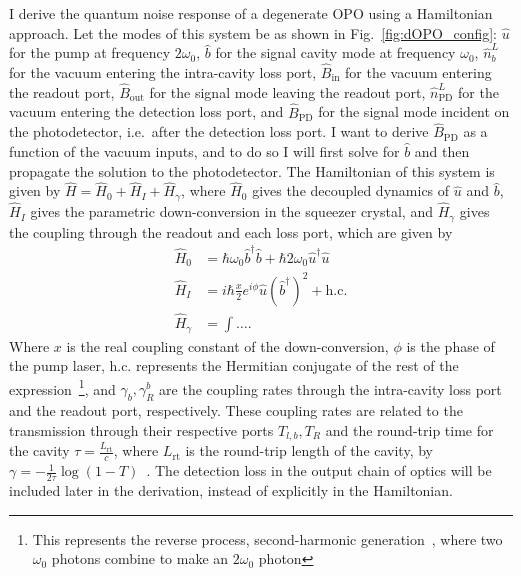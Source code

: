 I derive the quantum noise response of a degenerate OPO using a Hamiltonian approach. Let the modes of this system be as shown in Fig.~\ref{fig:dOPO_config}: $\hat u$ for the pump at frequency $2\omega_0$, $\hat b$ for the signal cavity mode at frequency $\omega_0$, $\hat n^L_b$ for the vacuum entering the intra-cavity loss port, $\hat B_\text{in}$ for the vacuum entering the readout port, $\hat B_\text{out}$ for the signal mode leaving the readout port, $\hat n^L_\text{PD}$ for the vacuum entering the detection loss port, and $\hat B_\text{PD}$ for the signal mode incident on the photodetector, i.e.\ after the detection loss port. I want to derive $\hat B_\text{PD}$ as a function of the vacuum inputs, and to do so I will first solve for $\hat b$ and then propagate the solution to the photodetector. 
The Hamiltonian of this system is given by $\hat H = \hat H_0 + \hat H_I + \hat H_\gamma$, where $\hat H_0$ gives the decoupled dynamics of $\hat u$ and $\hat b$, $\hat H_I$ gives the parametric down-conversion in the squeezer crystal, and $\hat H_\gamma$ gives the coupling through the readout and each loss port, which are given by~\cite{} 
\begin{align}
\hat H_0 &= \hbar \omega_0 \hat b^\dag \hat b + \hbar 2 \omega_0 \hat u^\dag \hat u\\
\hat H_I &= i \hbar \frac{x}{2} e^{i\phi} \hat u (\hat b^\dag)^2 + \text{h.c.}\\
\hat H_\gamma &= \int \ldots .
\end{align}
Where $x$ is the real coupling constant of the down-conversion, $\phi$ is the phase of the pump laser, $\text{h.c.}$ represents the Hermitian conjugate of the rest of the expression~\footnote{This represents the reverse process, second-harmonic generation~\cite{}, where two $\omega_0$ photons combine to make an $2\omega_0$ photon}, and $\gamma_b, \gamma^b_R$ are the coupling rates through the intra-cavity loss port and the readout port, respectively. These coupling rates are related to the transmission through their respective ports $T_{l,b}, T_R$ and the round-trip time for the cavity $\tau = \frac{L_\text{rt}}{c}$, where $L_\text{rt}$ is the round-trip length of the cavity, by $\gamma = -\frac{1}{2\tau}\log(1-T)$~\cite{}. The detection loss in the output chain of optics will be included later in the derivation, instead of explicitly in the Hamiltonian. 


